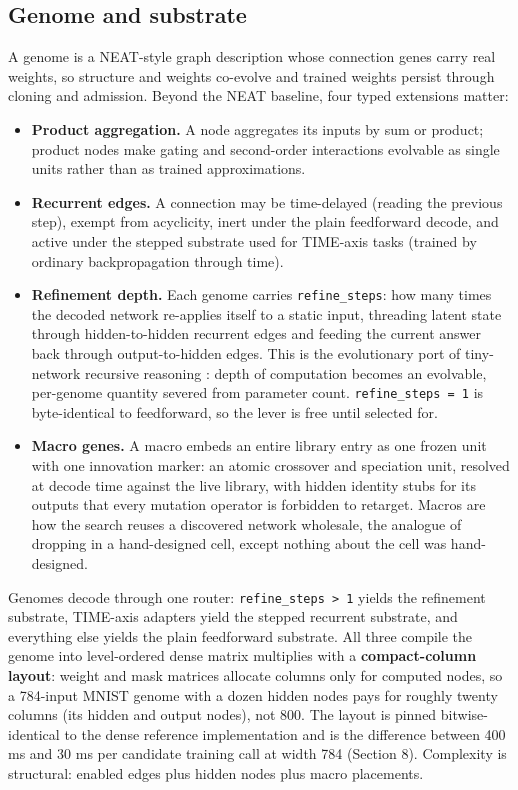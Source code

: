 \documentclass[11pt]{article}
\begin{document}
\subsection{Genome and substrate}

A genome is a NEAT-style graph description whose connection genes carry real weights, so structure and weights co-evolve and trained weights persist through cloning and admission. Beyond the NEAT baseline, four typed extensions matter:

\begin{itemize}[leftmargin=*]
\item \textbf{Product aggregation.} A node aggregates its inputs by sum or product; product nodes make gating and second-order interactions evolvable as single units rather than as trained approximations.
\item \textbf{Recurrent edges.} A connection may be time-delayed (reading the previous step), exempt from acyclicity, inert under the plain feedforward decode, and active under the stepped substrate used for TIME-axis tasks (trained by ordinary backpropagation through time).
\item \textbf{Refinement depth.} Each genome carries \texttt{refine_steps}: how many times the decoded network re-applies itself to a static input, threading latent state through hidden-to-hidden recurrent edges and feeding the current answer back through output-to-hidden edges. This is the evolutionary port of tiny-network recursive reasoning \citep{jolicoeurmartineau2025}: depth of computation becomes an evolvable, per-genome quantity severed from parameter count. \texttt{refine_steps = 1} is byte-identical to feedforward, so the lever is free until selected for.
\item \textbf{Macro genes.} A macro embeds an entire library entry as one frozen unit with one innovation marker: an atomic crossover and speciation unit, resolved at decode time against the live library, with hidden identity stubs for its outputs that every mutation operator is forbidden to retarget. Macros are how the search reuses a discovered network wholesale, the analogue of dropping in a hand-designed cell, except nothing about the cell was hand-designed.
\end{itemize}

Genomes decode through one router: \texttt{refine_steps > 1} yields the refinement substrate, TIME-axis adapters yield the stepped recurrent substrate, and everything else yields the plain feedforward substrate. All three compile the genome into level-ordered dense matrix multiplies with a \textbf{compact-column layout}: weight and mask matrices allocate columns only for computed nodes, so a 784-input MNIST genome with a dozen hidden nodes pays for roughly twenty columns (its hidden and output nodes), not 800. The layout is pinned bitwise-identical to the dense reference implementation and is the difference between 400 ms and 30 ms per candidate training call at width 784 (Section 8). Complexity is structural: enabled edges plus hidden nodes plus macro placements.
\end{document}
